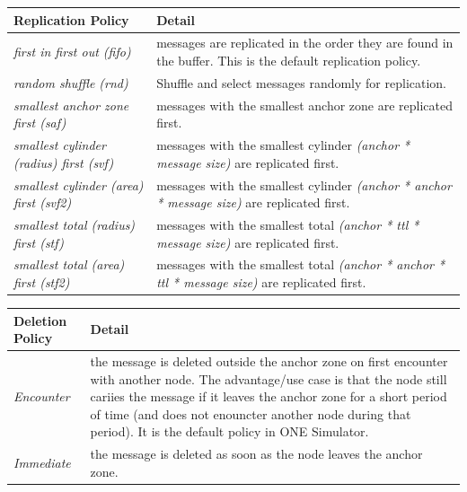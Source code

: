 \begin{center}
     \label{tab:title} 
    \begin{tabular}{ | l | p{8cm} |}
    \hline
    \textbf{Replication Policy} & \textbf{Detail} \\ \hline
    \textit{first in first out (fifo)} & messages are replicated in the order they are found in the buffer. This is the default replication policy.\\ \hline
    \textit{random shuffle (rnd)} & Shuffle and select messages randomly for replication. \\ \hline
    \textit{smallest anchor zone first (saf)} & messages with the smallest anchor zone are replicated first.  \\ \hline
    \textit{smallest cylinder (radius) first (svf)} & messages with the smallest cylinder \textit{(anchor * message size)} are replicated first. \\ \hline
    \textit{smallest cylinder (area) first (svf2)} & messages with the smallest cylinder \textit{(anchor * anchor * message size)} are replicated first. \\ \hline
    \textit{smallest total (radius) first (stf)} & messages with the smallest total \textit{(anchor * ttl * message size)} are replicated first. \\ \hline
    \textit{smallest total (area) first (stf2)} & messages with the smallest total \textit{(anchor * anchor * ttl * message size)} are replicated first. \\ \hline

    \end{tabular}
\end{center}
\newpage
\begin{center}
     \label{tab:title} 
    \begin{tabular}{ | l | p{11cm} |}
    \hline
    \textbf{Deletion Policy} & \textbf{Detail} \\ \hline
    \textit{Encounter} & the message is deleted outside the anchor zone on first encounter with another node. The advantage/use case is that the node still cariies the message if it leaves the anchor zone for a short period of time (and does not enouncter another node during that period). It is the default policy in ONE Simulator. \\ \hline
    \textit{Immediate} & the message is deleted as soon as the node leaves the anchor zone. \\ \hline
    \end{tabular}
\end{center}

